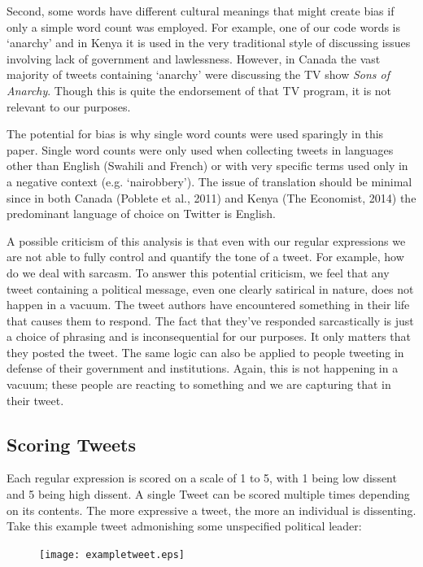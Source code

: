 \documentclass[12pt]{article}
\begin{document}
\begin{spacing}{1.5}
Second, some words have different cultural meanings that might create bias if only a simple word count was employed. For example, one of our code words is `anarchy' and in Kenya it is used in the very traditional style of discussing issues involving lack of government and lawlessness. However, in Canada the vast majority of tweets containing `anarchy' were discussing the TV show \textit{Sons of Anarchy}. Though this is quite the endorsement of that TV program, it is not relevant to our purposes. 

The potential for bias is why single word counts were used sparingly in this paper. Single word counts were only used when collecting tweets in languages other than English (Swahili and French) or with very specific terms used only in a negative context (e.g. `nairobbery'). The issue of translation should be minimal since in both Canada (Poblete et al., 2011) and Kenya (The Economist, 2014) the predominant language of choice on Twitter is English. 

A possible criticism of this analysis is that even with our regular expressions we are not able to fully control and quantify the tone of a tweet. For example, how do we deal with sarcasm. To answer this potential criticism, we feel that any tweet containing a political message, even one clearly satirical in nature, does not happen in a vacuum. The tweet authors have encountered something in their life that causes them to respond. The fact that they've responded sarcastically is just a choice of phrasing and is inconsequential for our purposes. It only matters that they posted the tweet. The same logic can also be applied to people tweeting in defense of their government and institutions. Again, this is not happening in a vacuum; these people are reacting to something and we are capturing that in their tweet.

\subsection*{Scoring Tweets}

Each regular expression is scored on a scale of 1 to 5, with 1 being low dissent and 5 being high dissent. A single Tweet can be scored multiple times depending on its contents. The more expressive a tweet, the more an individual is dissenting. Take this example tweet admonishing some unspecified political leader: 

\vspace{.5 em}

\begin{figure}[htb]
\centering 
\texttt{[image: exampletweet.eps]} 
\end{figure}
     

\end{spacing}
\end{document}
